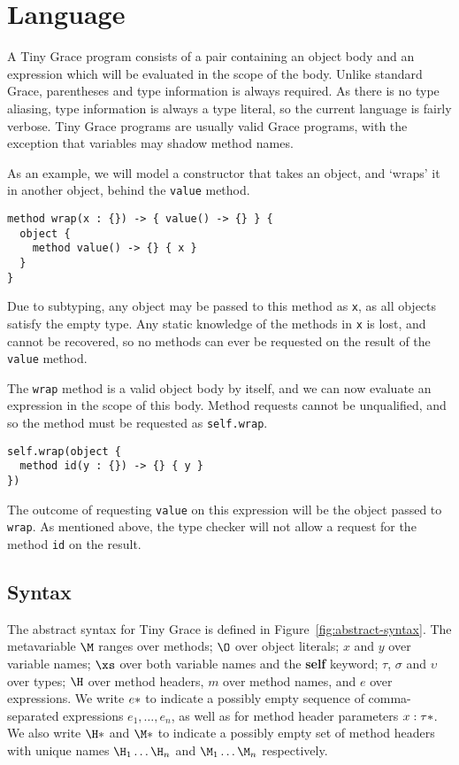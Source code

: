 \section{Language}
\label{sec:language}

A Tiny Grace program consists of a pair containing an object body and an
expression which will be evaluated in the scope of the body. Unlike standard
Grace, parentheses and type information is always required.  As there is no type
aliasing, type information is always a type literal, so the current language is
fairly verbose.  Tiny Grace programs are usually valid Grace programs, with the
exception that variables may shadow method names.

As an example, we will model a constructor that takes an object, and `wraps' it
in another object, behind the \lstinline{value} method.

\begin{lstlisting}
method wrap(x : {}) -> { value() -> {} } {
  object {
    method value() -> {} { x }
  }
}
\end{lstlisting}

\noindent Due to subtyping, any object may be passed to this method as
\lstinline{x}, as all objects satisfy the empty type.  Any static knowledge of
the methods in \lstinline{x} is lost, and cannot be recovered, so no methods can
ever be requested on the result of the \lstinline{value} method.

The \lstinline{wrap} method is a valid object body by itself, and we can now
evaluate an expression in the scope of this body.  Method requests cannot be
unqualified, and so the method must be requested as \lstinline{self.wrap}.

\begin{lstlisting}
self.wrap(object {
  method id(y : {}) -> {} { y }
})
\end{lstlisting}

\noindent The outcome of requesting \lstinline{value} on this expression will be
the object passed to \lstinline{wrap}.  As mentioned above, the type checker
will not allow a request for the method \lstinline{id} on the result.

\subsection{Syntax}
\label{sec:syntax}

The abstract syntax for Tiny Grace is defined in
Figure~\ref{fig:abstract-syntax}.  The metavariable $\M$ ranges over methods;
$\O$ over object literals; $x$ and $y$ over variable names; $\xs$ over both
variable names and the {\sffamily\bfseries self} keyword; $\tau$, $\sigma$ and
$\upsilon$ over types; $\H$ over method headers, $m$ over method names, and $e$
over expressions.  We write $\*e*$ to indicate a possibly empty sequence of
comma-separated expressions $e_1, \dots, e_n$, as well as for method header
parameters $\*x : \tau*$.  We also write $\*\H*$ and $\*\M*$ to indicate a
possibly empty set of method headers with unique names $\H_1 \dots \H_n$ and
$\M_1 \dots \M_n$ respectively.

